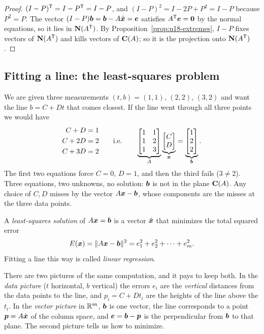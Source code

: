 \begin{proof}
$(I-P)^{\mathsf{T}}=I-P^{\mathsf{T}}=I-P$, and $(I-P)^2=I-2P+P^2=I-P$ because $P^2=P$. The vector
$(I-P)\boldsymbol{b}=\boldsymbol{b}-A\hat{\boldsymbol{x}}=\boldsymbol{e}$ satisfies $A^{\mathsf{T}}\boldsymbol{e}=\boldsymbol{0}$ by the normal equations,
so it lies in $\mathbf{N}(A^{\mathsf{T}})$. By Proposition~\ref{prop:u18-extremes}, $I-P$ fixes vectors of
$\mathbf{N}(A^{\mathsf{T}})$ and kills vectors of $\mathbf{C}(A)$; so it is the projection onto $\mathbf{N}(A^{\mathsf{T}})$.
\end{proof}

\subsection{Fitting a line: the least-squares problem}

We are given three measurements $(t,b)=(1,1),\,(2,2),\,(3,2)$ and want the line $b=C+Dt$
that comes closest. If the line went through all three points we would have
\[
  \begin{aligned}
    C+D&=1\\ C+2D&=2\\ C+3D&=2
  \end{aligned}
  \qquad\text{i.e.}\qquad
  \underbrace{\begin{bmatrix}1&1\\1&2\\1&3\end{bmatrix}}_{A}
  \underbrace{\begin{bmatrix}C\\D\end{bmatrix}}_{\boldsymbol{x}}
  =\underbrace{\begin{bmatrix}1\\2\\2\end{bmatrix}}_{\boldsymbol{b}} .
\]
The first two equations force $C=0$, $D=1$, and then the third fails ($3\neq 2$). Three
equations, two unknowns, no solution: $\boldsymbol{b}$ is not in the plane $\mathbf{C}(A)$. Any choice of
$C,D$ misses by the vector $A\boldsymbol{x}-\boldsymbol{b}$, whose components are the misses at the three data
points.

\begin{definition}\label{def:u18-ls}
A \emph{least-squares solution} of $A\boldsymbol{x}=\boldsymbol{b}$ is a vector $\hat{\boldsymbol{x}}$ that minimizes
the total squared error
\[
  E(\boldsymbol{x})=\|A\boldsymbol{x}-\boldsymbol{b}\|^2=e_1^2+e_2^2+\cdots+e_m^2 .
\]
Fitting a line this way is called \emph{linear regression}.
\end{definition}

There are two pictures of the same computation, and it pays to keep both. In the
\emph{data picture} ($t$ horizontal, $b$ vertical) the errors $e_i$ are the \emph{vertical}
distances from the data points to the line, and $p_i=C+Dt_i$ are the heights of the line
above the $t_i$. In the \emph{vector picture} in $\mathbb{R}^m$, $\boldsymbol{b}$ is one vector, the line
corresponds to a point $\boldsymbol{p}=A\hat{\boldsymbol{x}}$ of the column space, and
$\boldsymbol{e}=\boldsymbol{b}-\boldsymbol{p}$ is the perpendicular from $\boldsymbol{b}$ to that plane. The second picture
tells us how to minimize.

